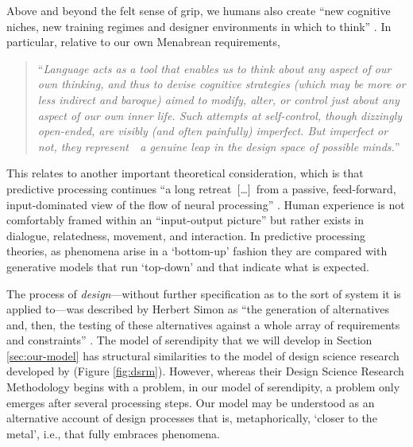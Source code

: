 Above and beyond the felt sense of grip, we humans also create ``new cognitive niches, new training regimes and designer environments in which to think'' \cite[p.~265]{pittphilsci10470}.  In particular, relative to our own Menabrean requirements,
\begin{quote}
``\emph{Language acts as a tool that enables us to think about any aspect of our own thinking, and thus to devise cognitive strategies (which may be more or less indirect and baroque) aimed to modify, alter, or control just about any aspect of our own inner life.  Such attempts at self-control, though dizzingly open-ended, are visibly (and often painfully) imperfect.  But imperfect or not, they represent~{\upshape[\ldots]}~a genuine leap in the design space of possible minds.}''
\end{quote}
This relates to another important theoretical consideration, which is that predictive processing continues ``a long retreat~[\ldots]~from a passive, feed-forward, input-dominated view of the flow of neural processing'' \cite[p.~2560]{Miller2018}.  Human experience is not comfortably framed within an “input-output picture” \cite{hurley2002consciousness} but rather exists in dialogue, relatedness, movement, and interaction.  In predictive processing theories, as phenomena arise in a `bottom-up' fashion they are compared with generative models that run `top-down' and that indicate what is expected.


The process of \emph{design}---without further specification as to the sort of system it is applied to---was described by Herbert Simon as ``the generation of alternatives and, then, the testing of these alternatives against a whole array of requirements and constraints'' \cite[pp.~128--129]{simon1996sciences}.  The model of serendipity that we will develop in Section \ref{sec:our-model} has structural similarities to the model of design science research developed by \citet{Peffers:2007:DSR:1481765.1481768} (Figure \ref{fig:dsrm}).  However, whereas their Design Science Research Methodology begins with a problem, in our model of serendipity, a problem only emerges after several processing steps.  Our model may be understood as an alternative account of design processes that is, metaphorically, `closer to the metal', i.e., that fully embraces phenomena.

